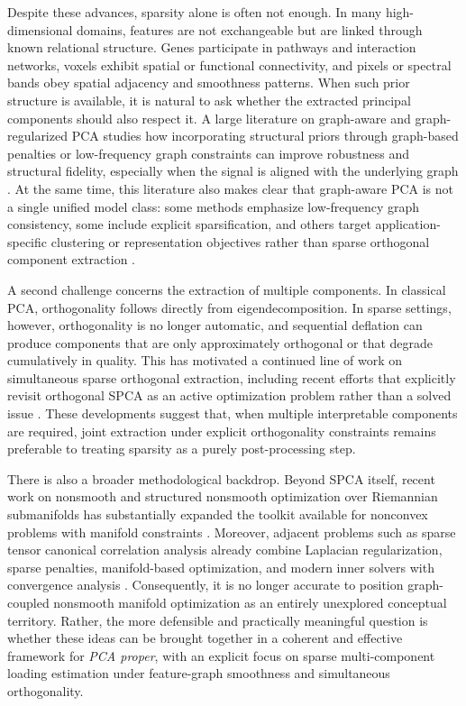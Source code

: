 \documentclass[10pt,twocolumn,letterpaper]{article}
\theoremstyle{definition}
\begin{document}
Despite these advances, sparsity alone is often not enough. In many high-dimensional domains, features are not exchangeable but are linked through known relational structure. Genes participate in pathways and interaction networks, voxels exhibit spatial or functional connectivity, and pixels or spectral bands obey spatial adjacency and smoothness patterns. When such prior structure is available, it is natural to ask whether the extracted principal components should also respect it. A large literature on graph-aware and graph-regularized PCA studies how incorporating structural priors through graph-based penalties or low-frequency graph constraints can improve robustness and structural fidelity, especially when the signal is aligned with the underlying graph \cite{briola2026grpca}. At the same time, this literature also makes clear that graph-aware PCA is not a single unified model class: some methods emphasize low-frequency graph consistency, some include explicit sparsification, and others target application-specific clustering or representation objectives rather than sparse orthogonal component extraction \cite{briola2026grpca,feng2019glspca,wu2019gdspca,wang2025rsspca}.

A second challenge concerns the extraction of multiple components. In classical PCA, orthogonality follows directly from eigendecomposition. In sparse settings, however, orthogonality is no longer automatic, and sequential deflation can produce components that are only approximately orthogonal or that degrade cumulatively in quality. This has motivated a continued line of work on simultaneous sparse orthogonal extraction, including recent efforts that explicitly revisit orthogonal SPCA as an active optimization problem rather than a solved issue \cite{chen2020amanpg,bertsimas2023geospca,cheng2026orthogonalspca}. These developments suggest that, when multiple interpretable components are required, joint extraction under explicit orthogonality constraints remains preferable to treating sparsity as a purely post-processing step.

There is also a broader methodological backdrop. Beyond SPCA itself, recent work on nonsmooth and structured nonsmooth optimization over Riemannian submanifolds has substantially expanded the toolkit available for nonconvex problems with manifold constraints \cite{li2024structurednonsmooth,chen2024nonsmoothstiefel}. Moreover, adjacent problems such as sparse tensor canonical correlation analysis already combine Laplacian regularization, sparse penalties, manifold-based optimization, and modern inner solvers with convergence analysis \cite{zhu2025stccal}. Consequently, it is no longer accurate to position graph-coupled nonsmooth manifold optimization as an entirely unexplored conceptual territory. Rather, the more defensible and practically meaningful question is whether these ideas can be brought together in a coherent and effective framework for \emph{PCA proper}, with an explicit focus on sparse multi-component loading estimation under feature-graph smoothness and simultaneous orthogonality.
\end{document}
